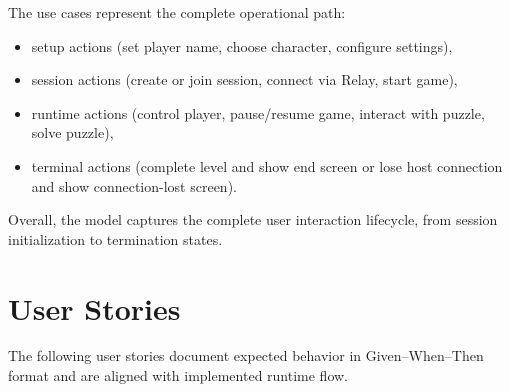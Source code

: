 The use cases represent the complete operational path:
\begin{itemize}
\item setup actions (set player name, choose character, configure settings),
\item session actions (create or join session, connect via Relay, start game),
\item runtime actions (control player, pause/resume game, interact with puzzle, solve puzzle),
\item terminal actions (complete level and show end screen or lose host connection and show connection-lost screen).
\end{itemize}

Overall, the model captures the complete user interaction lifecycle, from session initialization to termination states.

\section{User Stories}
The following user stories document expected behavior in Given--When--Then format and are aligned with implemented runtime flow.

